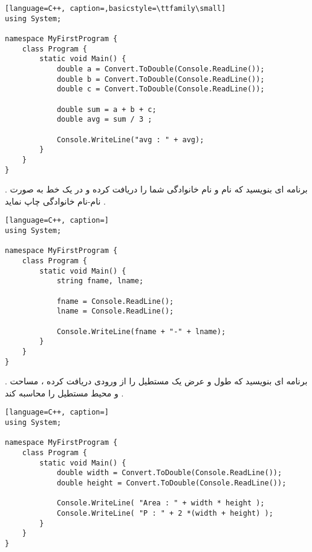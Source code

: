 \documentclass[12pt]{article}
\begin{document}
\begin{latin}
\begin{lstlisting}[language=C++, caption=,basicstyle=\ttfamily\small]
using System;

namespace MyFirstProgram {
	class Program {
		static void Main() {
			double a = Convert.ToDouble(Console.ReadLine());
			double b = Convert.ToDouble(Console.ReadLine());
			double c = Convert.ToDouble(Console.ReadLine());
			
			double sum = a + b + c;
			double avg = sum / 3 ;
			
			Console.WriteLine("avg : " + avg);
		}
	}
}
\end{lstlisting}
\end{latin}





\newpage

 . برنامه ای بنویسید که نام و نام خانوادگی شما را دریافت کرده و در یک خط به صورت نام-نام خانوادگی چاپ نماید .


\begin{latin}
\begin{lstlisting}[language=C++, caption=]
using System;

namespace MyFirstProgram {
	class Program {
		static void Main() {
			string fname, lname;
			
			fname = Console.ReadLine();
			lname = Console.ReadLine();
			
			Console.WriteLine(fname + "-" + lname);
		}
	}
}
\end{lstlisting}
\end{latin}




 . برنامه ای بنویسید که طول و عرض یک مستطیل را از ورودی دریافت کرده ، مساحت و محیط مستطیل را محاسبه کند .


\begin{latin}
\begin{lstlisting}[language=C++, caption=]
using System;

namespace MyFirstProgram {
	class Program {
		static void Main() {
			double width = Convert.ToDouble(Console.ReadLine());
			double height = Convert.ToDouble(Console.ReadLine());
			
			Console.WriteLine( "Area : " + width * height );
			Console.WriteLine( "P : " + 2 *(width + height) );
		}
	}
}
\end{lstlisting}
\end{latin}
\end{document}
